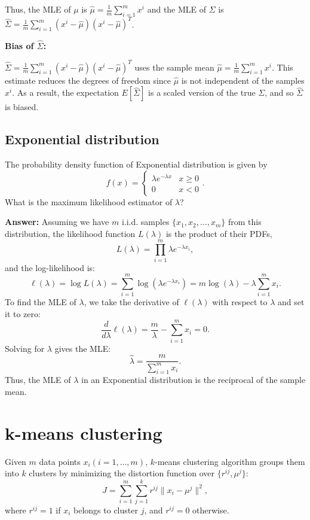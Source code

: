 \documentclass{article}
\begin{document}
Thus, the MLE of $\mu$ is \(\hat{\mu} = \frac{1}{m} \sum_{i=1}^m x^{i}\) and the MLE of $\Sigma$ is \(\hat{\Sigma} = \frac{1}{m} \sum_{i=1}^m (x^{i} - \hat{\mu})(x^{i} - \hat{\mu})^T\).

\textbf{Bias of $\hat{\Sigma}$:}

\(\hat{\Sigma} = \frac{1}{m} \sum_{i=1}^m (x^{i} - \hat{\mu})(x^{i} - \hat{\mu})^T\) uses the sample mean \(\hat{\mu} = \frac{1}{m} \sum_{i=1}^m x^{i}\).
This estimate reduces the degrees of freedom since \(\hat{\mu}\) is not independent of the samples \(x^{i}\).
As a result, the expectation \(E[\hat{\Sigma}]\) is a scaled version of the true \(\Sigma\), and so \(\hat{\Sigma}\) is biased.

\subsection{Exponential distribution}

The probability density function of Exponential distribution is given by
$$f(x) = \begin{cases}
    \lambda e^{-\lambda x} & x \geq 0 \\
    0 & x < 0
\end{cases}.$$
What is the maximum likelihood estimator of $\lambda$?

\textbf{Answer:} Assuming we have \(m\) i.i.d. samples \(\{x_1, x_2, \ldots, x_m\}\) from this distribution, the likelihood function \(L(\lambda)\) is the product of their PDFs,
$$L(\lambda) = \prod_{i=1}^m \lambda e^{-\lambda x_i},$$
and the log-likelihood is:
$$\ell(\lambda) = \log L(\lambda) = \sum_{i=1}^m \log(\lambda e^{-\lambda x_i}) = m \log(\lambda) - \lambda \sum_{i=1}^m x_i.$$
To find the MLE of \(\lambda\), we take the derivative of \(\ell(\lambda)\) with respect to \(\lambda\) and set it to zero:
$$\frac{d}{d\lambda} \ell(\lambda) = \frac{m}{\lambda} - \sum_{i=1}^m x_i = 0.$$
Solving for \(\lambda\) gives the MLE:
$$\hat{\lambda} = \frac{m}{\sum_{i=1}^m x_i}.$$
Thus, the MLE of \(\lambda\) in an Exponential distribution is the reciprocal of the sample mean.

\section{k-means clustering}

Given $m$ data points $x_i(i = 1,\dots,m)$, $k$-means clustering algorithm groups them into $k$ clusters by minimizing the distortion function over $\{r^{ij}, \mu^j\}$:
$$J = \sum_{i=1}^m \sum_{j=1}^k r^{ij} \|x_i - \mu^j\|^2,$$
where $r^{ij} = 1$ if $x_i$ belongs to cluster $j$, and $r^{ij} = 0$ otherwise.
\end{document}
